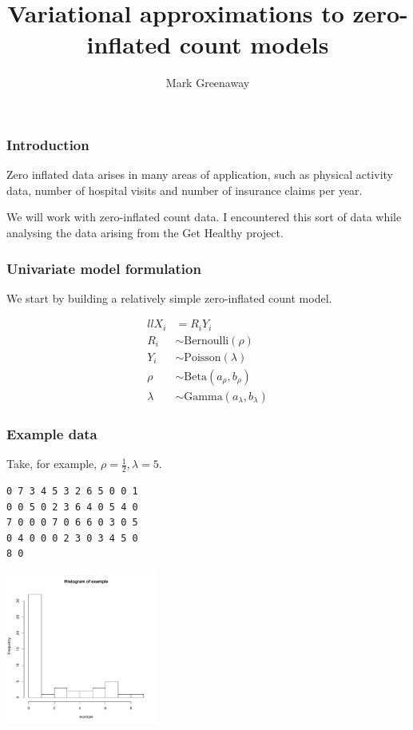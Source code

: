 \documentclass{beamer}
\title{Variational approximations to zero-inflated count models}
\author{Mark Greenaway}
\begin{document}
\begin{frame}
\titlepage
\end{frame}

\begin{frame}
\frametitle{Introduction}
Zero inflated data arises in many areas of application, such as physical
activity data, number of hospital visits and number of insurance claims per
year.

We will work with zero-inflated count data. I encountered this sort of data while
analysing the data arising from the Get Healthy project.
\end{frame}
\begin{frame}
\frametitle{Univariate model formulation}
We start by building a relatively simple zero-inflated count model.

\begin{align*}{ll}
X_i &= R_i Y_i \\
R_i &\sim \text{Bernoulli}(\rho) \\
Y_i &\sim \text{Poisson}(\lambda) \\
\rho &\sim \text{Beta}(a_\rho, b_\rho) \\
\lambda &\sim \text{Gamma}(a_\lambda, b_\lambda)
\end{align*}

\end{frame}

\begin{frame}[fragile]
\frametitle{Example data}
Take, for example, $\rho = \frac{1}{2}, \lambda = 5$.

\begin{verbatim}
0 7 3 4 5 3 2 6 5 0 0 1
0 0 5 0 2 3 6 4 0 5 4 0
7 0 0 0 7 0 6 6 0 3 0 5
0 4 0 0 0 2 3 0 3 4 5 0
8 0
\end{verbatim}

\includegraphics[width=50mm, height=50mm]{code/univariate_data_histogram.pdf}
\end{frame}
\end{document}
